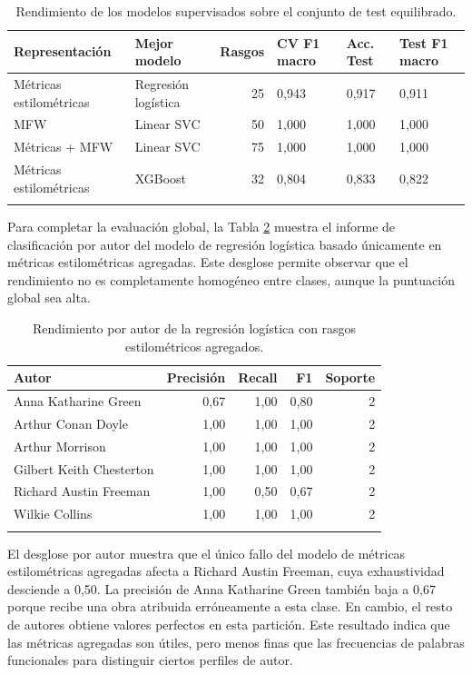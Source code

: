 \documentclass[IB]{TFUOC}%
\begin{document}
\begin{longtable}{|p{4.2cm}|p{3.4cm}|r|p{1.4cm}|p{1.1cm}|p{1.6cm}|}
\hline
\textbf{Representación} & \textbf{Mejor modelo} & \textbf{Rasgos} & \textbf{CV F1 macro} & \textbf{Acc. Test} & \textbf{Test F1 macro} \\
\hline
Métricas estilométricas & Regresión logística & 25 & 0,943 & 0,917 & 0,911 \\
\hline
MFW & Linear SVC & 50 & 1,000 & 1,000 & 1,000 \\
\hline
Métricas + MFW & Linear SVC & 75 & 1,000 & 1,000 & 1,000 \\
\hline
Métricas estilométricas & XGBoost & 32 & 0,804 & 0,833 & 0,822 \\
\hline
\caption{Rendimiento de los modelos supervisados sobre el conjunto de test equilibrado.}
\label{tab:rendimiento-modelos-supervisados}
\end{longtable}

Para completar la evaluación global, la Tabla \ref{tab:rendimiento-base-por-autor} muestra el informe de clasificación por autor del modelo de regresión logística basado únicamente en métricas estilométricas agregadas. Este desglose permite observar que el rendimiento no es completamente homogéneo entre clases, aunque la puntuación global sea alta.

\begin{longtable}{|p{4.5cm}|r|r|r|r|}
\hline
\textbf{Autor} & \textbf{Precisión} & \textbf{Recall} & \textbf{F1} & \textbf{Soporte} \\
\hline
Anna Katharine Green & 0,67 & 1,00 & 0,80 & 2 \\
\hline
Arthur Conan Doyle & 1,00 & 1,00 & 1,00 & 2 \\
\hline
Arthur Morrison & 1,00 & 1,00 & 1,00 & 2 \\
\hline
Gilbert Keith Chesterton & 1,00 & 1,00 & 1,00 & 2 \\
\hline
Richard Austin Freeman & 1,00 & 0,50 & 0,67 & 2 \\
\hline
Wilkie Collins & 1,00 & 1,00 & 1,00 & 2 \\
\hline
\caption{Rendimiento por autor de la regresión logística con rasgos estilométricos agregados.}
\label{tab:rendimiento-base-por-autor}
\end{longtable}

El desglose por autor muestra que el único fallo del modelo de métricas estilométricas agregadas afecta a Richard Austin Freeman, cuya exhaustividad desciende a 0,50. La precisión de Anna Katharine Green también baja a 0,67 porque recibe una obra atribuida erróneamente a esta clase. En cambio, el resto de autores obtiene valores perfectos en esta partición. Este resultado indica que las métricas agregadas son útiles, pero menos finas que las frecuencias de palabras funcionales para distinguir ciertos perfiles de autor.
\end{document}

